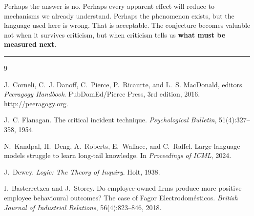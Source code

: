 \documentclass[10pt,twocolumn]{article}
\begin{document}
\vspace{0.5em}
\noindent\textcolor{headinggray}{Perhaps the answer is no. Perhaps every apparent effect will reduce to mechanisms we already understand. Perhaps the phenomenon exists, but the language used here is wrong. That is acceptable. The conjecture becomes valuable not when it survives criticism, but when criticism tells us \textbf{what must be measured next}.}

\vspace{1em}

{\centering
{\color{ruleblue}\rule{0.6\textwidth}{0.5pt}}\par}

\clearpage

\begin{thebibliography}{9}

J.~Corneli, C.~J. Danoff, C.~Pierce, P.~Ricaurte, and L.~S. MacDonald, editors.
\newblock \emph{Peeragogy Handbook}.
\newblock PubDomEd/Pierce Press, 3rd edition, 2016.
\newblock \url{http://peeragogy.org}.

J.~C. Flanagan.
\newblock The critical incident technique.
\newblock \emph{Psychological Bulletin}, 51(4):327--358, 1954.

N.~Kandpal, H.~Deng, A.~Roberts, E.~Wallace, and C.~Raffel.
\newblock Large language models struggle to learn long-tail knowledge.
\newblock In \emph{Proceedings of ICML}, 2024.

J.~Dewey.
\newblock \emph{Logic: The Theory of Inquiry}.
\newblock Holt, 1938.

I.~Basterretxea and J.~Storey.
\newblock Do employee-owned firms produce more positive employee behavioural
  outcomes? The case of Fagor Electrodom\'{e}sticos.
\newblock \emph{British Journal of Industrial Relations}, 56(4):823--846, 2018.

\end{thebibliography}
\end{document}
